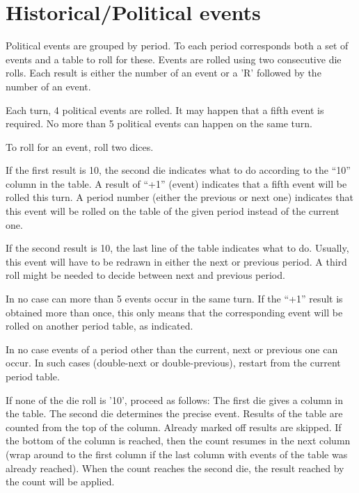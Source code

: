 \section{Historical/Political events}\label{chEvents:political-events}

\aparag Political events are grouped by period. To each period
corresponds both a set of events and a table to roll for these. Events
are rolled using two consecutive die rolls. Each result is either the
number of an event or a 'R' followed by the number of an event.

\aparag Each turn, 4 political events are rolled. It may happen that a
fifth event is required. No more than 5 political events can happen on
the same turn.

\aparag To roll for an event, roll two dices.

\aparag If the first result is 10, the second die indicates what to do
according to the ``10'' column in the table.
\bparag A result of ``+1'' (event) indicates that a fifth event will be
rolled this turn.
\bparag A period number (either the previous or next one) indicates that
this event will be rolled on the table of the given period instead of
the current one.

\aparag If the second result is 10, the last line of the table indicates
what to do.
\bparag Usually, this event will have to be redrawn in either the next
or previous period. A third roll might be needed to decide between next
and previous period.

\aparag In no case can more than 5 events occur in the same turn. If the
``+1'' result is obtained more than once, this only means that the
corresponding event will be rolled on another period table, as
indicated.

\aparag In no case events of a period other than the current, next or
previous one can occur.
\bparag In such cases (double-next or double-previous), restart from the
current period table.

\aparag If none of the die roll is '10', proceed as follows:
\bparag The first die gives a column in the table.
\bparag The second die determines the precise event.
\bparag Results of the table are counted from the top of the column.
\bparag Already marked off results are skipped.
\bparag If the bottom of the column is reached, then the count resumes
in the next column (wrap around to the first column if the last column
with events of the table was already reached).
\bparag When the count reaches the second die, the result reached by the
count will be applied.

